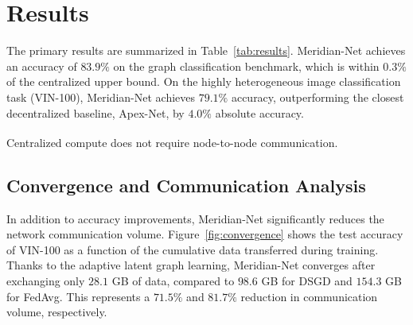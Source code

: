 \section{Results}
The primary results are summarized in Table~\ref{tab:results}. Meridian-Net achieves an accuracy of $83.9\%$ on the graph classification benchmark, which is within $0.3\%$ of the centralized upper bound. On the highly heterogeneous image classification task (VIN-100), Meridian-Net achieves $79.1\%$ accuracy, outperforming the closest decentralized baseline, Apex-Net, by $4.0\%$ absolute accuracy.

\begin{table}[t]
  \centering
  \caption{Performance evaluation of Meridian-Net against baseline methods on graph classification and Vertex Image Net. Accuracy ($\%$) is reported as the mean and standard deviation over five random seeds. Communication costs represent cumulative data transferred (GB) to reach convergence.}
  \label{tab:results}
  \small \textsuperscript{\textdagger}Centralized compute does not require node-to-node communication.
\end{table}

\subsection{Convergence and Communication Analysis}
In addition to accuracy improvements, Meridian-Net significantly reduces the network communication volume. Figure~\ref{fig:convergence} shows the test accuracy of VIN-100 as a function of the cumulative data transferred during training. Thanks to the adaptive latent graph learning, Meridian-Net converges after exchanging only $28.1$ GB of data, compared to $98.6$ GB for DSGD and $154.3$ GB for FedAvg. This represents a $71.5\%$ and $81.7\%$ reduction in communication volume, respectively.

